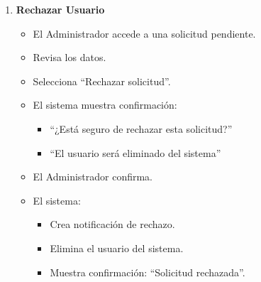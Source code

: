 \begin{enumerate}[nosep]
    \item \textbf{Rechazar Usuario}
    \begin{itemize}[nosep]
        \item El Administrador accede a una solicitud pendiente.
        \item Revisa los datos.
        \item Selecciona ``Rechazar solicitud''.
        \item El sistema muestra confirmación:
        \begin{itemize}[nosep]
            \item ``¿Está seguro de rechazar esta solicitud?''
            \item ``El usuario será eliminado del sistema''
        \end{itemize}
        \item El Administrador confirma.
        \item El sistema:
        \begin{itemize}[nosep]
            \item Crea notificación de rechazo.
            \item Elimina el usuario del sistema.
            \item Muestra confirmación: ``Solicitud rechazada''.
        \end{itemize}
    \end{itemize}


\end{enumerate}
